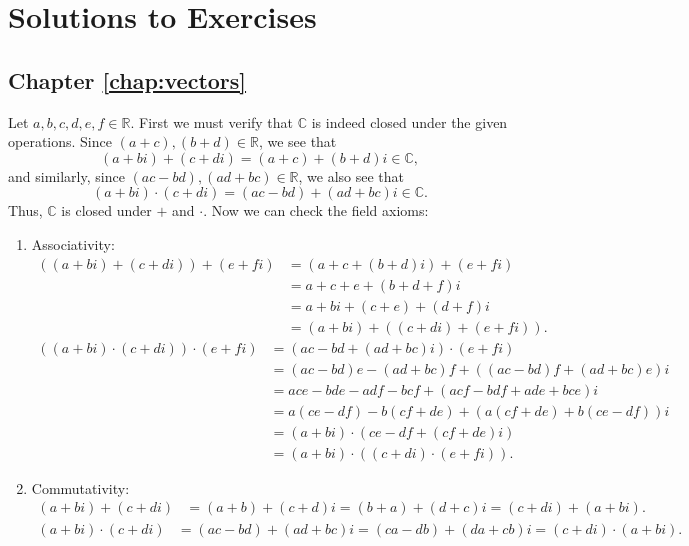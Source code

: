 \chapter{Solutions to Exercises}
\footnotesize

\section*{Chapter \ref{chap:vectors}}

\begin{sltn}[\ref{exer:cfield}]
Let $ a,b,c,d,e,f\in\mathbb{R} $. First we must verify that $ \mathbb{C} $ is indeed closed under the given operations. Since $ (a+c),(b+d)\in\mathbb{R} $, we see that
\begin{equation*}
    (a+bi)+(c+di)=(a+c)+(b+d)i\in\mathbb{C},
\end{equation*}
and similarly, since $ (ac-bd),(ad+bc)\in\mathbb{R} $, we also see that
\begin{equation*}
    (a+bi)\cdot(c+di)=(ac-bd)+(ad+bc)i\in\mathbb{C}.
\end{equation*}
Thus, $ \mathbb{C} $ is closed under $ + $ and $ \cdot $. Now we can check the field axioms:
\begin{enumerate}
    \item Associativity:
    \begin{align*}
        ((a+bi)+(c+di))+(e+fi) &= (a+c+(b+d)i)+(e+fi) \\
        &= a+c+e+(b+d+f)i \\
        &= a+bi+(c+e)+(d+f)i \\
        &= (a+bi)+((c+di)+(e+fi)).
    \end{align*}
    \begin{align*}
        ((a+bi)\cdot(c+di))\cdot(e+fi) &= (ac-bd+(ad+bc)i)\cdot(e+fi) \\
        &= (ac-bd)e-(ad+bc)f+((ac-bd)f+(ad+bc)e)i \\
        &= ace-bde-adf-bcf+(acf-bdf+ade+bce)i \\
        &= a(ce-df)-b(cf+de)+(a(cf+de)+b(ce-df))i \\
        &= (a+bi)\cdot(ce-df+(cf+de)i) \\
        &= (a+bi)\cdot((c+di)\cdot(e+fi)).
    \end{align*}

    \item Commutativity:
    \begin{align*}
        (a+bi)+(c+di) &= (a+b)+(c+d)i=(b+a)+(d+c)i=(c+di)+(a+bi).
    \end{align*}
    \begin{align*}
        (a+bi)\cdot(c+di) &= (ac-bd)+(ad+bc)i=(ca-db)+(da+cb)i=(c+di)\cdot(a+bi).
    \end{align*}


\end{enumerate}
\end{sltn}
